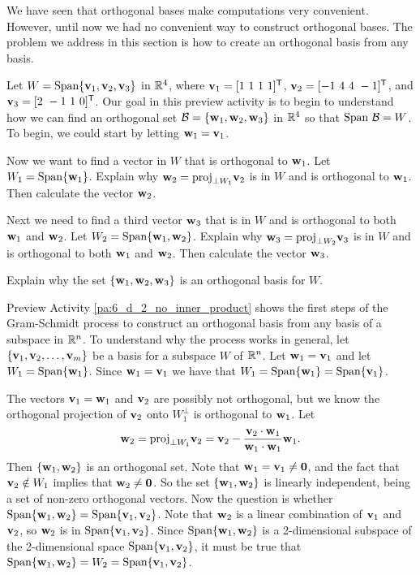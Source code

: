 We have seen that orthogonal bases make computations very convenient. However, until now we had no convenient way to construct orthogonal bases. The problem we address in this section is how to create an orthogonal basis from any basis.  

\begin{pa} \label{pa:6_d_2_no_inner_product}  Let $W = \text{Span} \{\mathbf{v}_1, \mathbf{v}_2, \mathbf{v}_3\}$ in $\mathbb{R}^4$, where $\mathbf{v}_1 = [1 \ 1 \ 1 \ 1]^{\mathsf{T}}$, $\mathbf{v}_2 = [-1 \ 4 \ 4 \ -1]^{\mathsf{T}}$, and $\mathbf{v}_3 = [2 \ -1 \ 1 \ 0]^{\mathsf{T}}$. Our goal in this preview activity is to begin to understand how we can find an orthogonal set $\mathcal{B} = \{\mathbf{w}_1, \mathbf{w}_2, \mathbf{w}_3\}$ in $\mathbb{R}^4$ so that $\text{Span} \ \mathcal{B} = W$. To begin, we could start by letting $\mathbf{w}_1 = \mathbf{v}_1$. 
	\be
	\item Now we want to find a vector in $W$ that is orthogonal to $\mathbf{w}_1$. Let $W_1 = \text{Span}\{\mathbf{w}_1\}$. Explain why $\mathbf{w}_2 = \text{proj}_{\perp W_1} \mathbf{v}_2$ is in $W$ and is orthogonal to $\mathbf{w}_1$. Then calculate the vector $\mathbf{w}_2$.  


	\item Next we need to find a third vector $\mathbf{w}_3$ that is in $W$ and is orthogonal to both $\mathbf{w}_1$ and $\mathbf{w}_2$. Let $W_2 = \text{Span} \{\mathbf{w}_1, \mathbf{w}_2\}$. Explain why $\mathbf{w}_3 = \text{proj}_{\perp W_2} \mathbf{v}_3$ is in $W$ and is orthogonal to both $\mathbf{w}_1$ and $\mathbf{w}_2$. Then calculate the vector $\mathbf{w}_3$.  

	\item Explain why the set $\{\mathbf{w}_1, \mathbf{w}_2, \mathbf{w}_3\}$ is an orthogonal basis for $W$. 


	\ee
	
\end{pa}

Preview Activity \ref{pa:6_d_2_no_inner_product} shows the first steps of the Gram-Schmidt process to construct an orthogonal basis from any basis of a subspace in $\mathbb{R}^n$. To understand why the process works in general, let $\{\mathbf{v}_1, \mathbf{v}_2, \ldots, \mathbf{v}_m\}$ be a basis for a subspace $W$ of $\mathbb{R}^n$. Let $\mathbf{w}_1 = \mathbf{v}_1$ and let $W_1 = \text{Span}\{\mathbf{w}_1\}$. Since $\mathbf{w}_1 = \mathbf{v}_1$ we have that $W_1 = \text{Span}\{\mathbf{w}_1\} = \text{Span}\{\mathbf{v}_1\}$. 

The vectors $\mathbf{v}_1 = \mathbf{w}_1$ and $\mathbf{v}_2$ are possibly not orthogonal, but we know the orthogonal projection of $\mathbf{v}_2$ onto $W_1^{\perp}$ is orthogonal to $\mathbf{w}_1$. Let
\[\mathbf{w}_2 = \text{proj}_{\perp W_1} \mathbf{v}_2 = \mathbf{v}_2 -  \frac{ \mathbf{v}_2 \cdot \mathbf{w}_1 }{ \mathbf{w}_1 \cdot  \mathbf{w}_1 } \mathbf{w}_1.\]
Then $\{\mathbf{w}_1, \mathbf{w}_2\}$ is an orthogonal set. Note that $\mathbf{w}_1 = \mathbf{v}_1 \neq \mathbf{0}$, and the fact that $\mathbf{v}_2 \notin W_1$ implies that $\mathbf{w}_2 \neq \mathbf{0}$. So the set $\{\mathbf{w}_1, \mathbf{w}_2\}$ is linearly independent, being a set of non-zero orthogonal vectors. Now the question is whether $\text{Span}\{\mathbf{w}_1,\mathbf{w}_2\} = \text{Span}\{\mathbf{v}_1,\mathbf{v}_2\}$. Note that $\mathbf{w}_2$ is a linear combination of $\mathbf{v}_1$ and $\mathbf{v}_2$, so $\mathbf{w}_2$ is in $\text{Span}\{\mathbf{v}_1,\mathbf{v}_2\}$. Since $\text{Span}\{\mathbf{w}_1,\mathbf{w}_2\}$ is a 2-dimensional subspace of the 2-dimensional space $\text{Span}\{\mathbf{v}_1,\mathbf{v}_2\}$, it must be true that $\text{Span}\{\mathbf{w}_1,\mathbf{w}_2\} = W_2 = \text{Span}\{\mathbf{v}_1,\mathbf{v}_2\}$.

